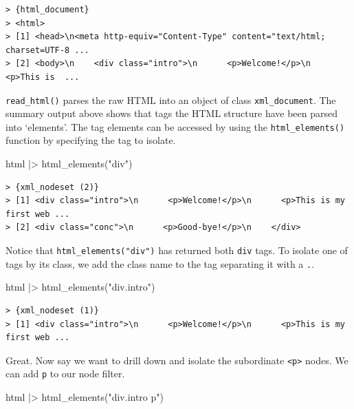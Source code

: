 \documentclass[
  letterpaper,
]{latex/krantz}
\newenvironment{Shaded}{\begin{snugshade}}{\end{snugshade}}
\newcommand{\FunctionTok}[1]{\textcolor[rgb]{0.00,0.00,0.00}{#1}}
\newcommand{\NormalTok}[1]{\textcolor[rgb]{0.00,0.00,0.00}{#1}}
\newcommand{\SpecialCharTok}[1]{\textcolor[rgb]{0.00,0.00,0.00}{#1}}
\newcommand{\StringTok}[1]{\textcolor[rgb]{0.00,0.00,0.00}{#1}}
\begin{document}
\begin{verbatim}
> {html_document}
> <html>
> [1] <head>\n<meta http-equiv="Content-Type" content="text/html; charset=UTF-8 ...
> [2] <body>\n    <div class="intro">\n      <p>Welcome!</p>\n      <p>This is  ...
\end{verbatim}

\texttt{read\_html()} parses the raw HTML into an object of class
\texttt{xml\_document}. The summary output above shows that tags the
HTML structure have been parsed into `elements'. The tag elements can be
accessed by using the \texttt{html\_elements()} function by specifying
the tag to isolate.

\begin{Shaded}
\begin{Highlighting}[]
\NormalTok{html }\SpecialCharTok{|\textgreater{}} 
  \FunctionTok{html\_elements}\NormalTok{(}\StringTok{"div"}\NormalTok{)}
\end{Highlighting}
\end{Shaded}

\begin{verbatim}
> {xml_nodeset (2)}
> [1] <div class="intro">\n      <p>Welcome!</p>\n      <p>This is my first web ...
> [2] <div class="conc">\n      <p>Good-bye!</p>\n    </div>
\end{verbatim}

Notice that \texttt{html\_elements("div")} has returned both
\texttt{div} tags. To isolate one of tags by its class, we add the class
name to the tag separating it with a \texttt{.}.

\begin{Shaded}
\begin{Highlighting}[]
\NormalTok{html }\SpecialCharTok{|\textgreater{}} 
  \FunctionTok{html\_elements}\NormalTok{(}\StringTok{"div.intro"}\NormalTok{)}
\end{Highlighting}
\end{Shaded}

\begin{verbatim}
> {xml_nodeset (1)}
> [1] <div class="intro">\n      <p>Welcome!</p>\n      <p>This is my first web ...
\end{verbatim}

Great. Now say we want to drill down and isolate the subordinate
\texttt{\textless{}p\textgreater{}} nodes. We can add \texttt{p} to our
node filter.

\begin{Shaded}
\begin{Highlighting}[]
\NormalTok{html }\SpecialCharTok{|\textgreater{}} 
  \FunctionTok{html\_elements}\NormalTok{(}\StringTok{"div.intro p"}\NormalTok{)}
\end{Highlighting}
\end{Shaded}
\end{document}
